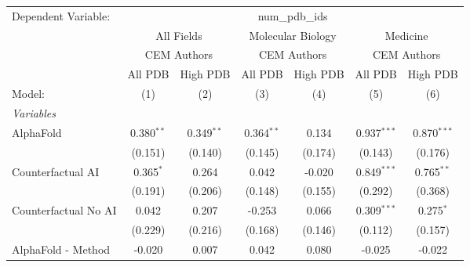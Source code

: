 \begingroup
\centering
\begin{tabular}{lcccccc}
   \tabularnewline \midrule \midrule
   Dependent Variable: & \multicolumn{6}{c}{num\_pdb\_ids}\\
 & \multicolumn{2}{c}{All Fields} & \multicolumn{2}{c}{Molecular Biology} & \multicolumn{2}{c}{Medicine} \\
\cmidrule(lr){2-3} \cmidrule(lr){4-5} \cmidrule(lr){6-7}
 & \multicolumn{2}{c}{CEM Authors} & \multicolumn{2}{c}{CEM Authors} & \multicolumn{2}{c}{CEM Authors} \\
\cmidrule(lr){2-3} \cmidrule(lr){4-5} \cmidrule(lr){6-7}
 & \multicolumn{1}{c}{All PDB} & \multicolumn{1}{c}{High PDB} & \multicolumn{1}{c}{All PDB} & \multicolumn{1}{c}{High PDB} & \multicolumn{1}{c}{All PDB} & \multicolumn{1}{c}{High PDB} \\
\cmidrule(lr){2-2} \cmidrule(lr){3-3} \cmidrule(lr){4-4} \cmidrule(lr){5-5} \cmidrule(lr){6-6} \cmidrule(lr){7-7}
   Model:                                                     & (1)           & (2)          & (3)            & (4)            & (5)           & (6)\\  
   \midrule
   \emph{Variables}\\
   AlphaFold                                                  & 0.380$^{**}$  & 0.349$^{**}$ & 0.364$^{**}$   & 0.134          & 0.937$^{***}$ & 0.870$^{***}$\\   
                                                              & (0.151)       & (0.140)      & (0.145)        & (0.174)        & (0.143)       & (0.176)\\   
   Counterfactual AI                                          & 0.365$^{*}$   & 0.264        & 0.042          & -0.020         & 0.849$^{***}$ & 0.765$^{**}$\\   
                                                              & (0.191)       & (0.206)      & (0.148)        & (0.155)        & (0.292)       & (0.368)\\   
   Counterfactual No AI                                       & 0.042         & 0.207        & -0.253         & 0.066          & 0.309$^{***}$ & 0.275$^{*}$\\   
                                                              & (0.229)       & (0.216)      & (0.168)        & (0.146)        & (0.112)       & (0.157)\\   
   AlphaFold - Method                                         & -0.020        & 0.007        & 0.042          & 0.080          & -0.025        & -0.022\\   

\end{tabular}
